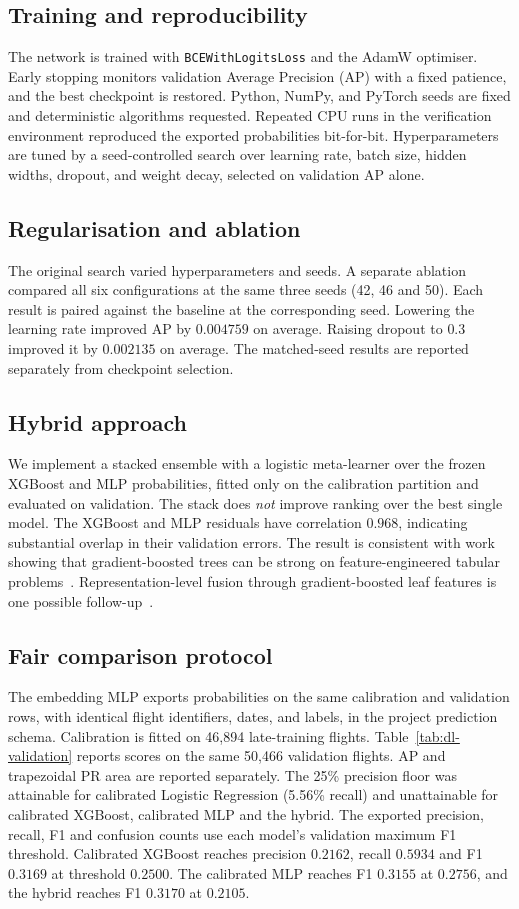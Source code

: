 \documentclass[conference]{IEEEtran}
\newcommand{\code}[1]{\texttt{#1}}
\begin{document}
\subsection{Training and reproducibility}
The network is trained with \code{BCEWithLogitsLoss} and the AdamW optimiser.
Early stopping monitors validation Average Precision (AP) with a fixed patience,
and the best checkpoint is restored. Python, NumPy, and PyTorch seeds are fixed
and deterministic algorithms requested. Repeated CPU runs in the verification
environment reproduced the exported probabilities bit-for-bit.
Hyperparameters are tuned by a seed-controlled search
over learning rate, batch size, hidden widths, dropout, and weight decay, selected
on validation AP alone.

\subsection{Regularisation and ablation}
The original search varied hyperparameters and seeds. A separate ablation
compared all six configurations at the same three seeds (42, 46 and 50).
Each result is paired against the baseline at the corresponding seed.
Lowering the learning rate improved AP by $0.004759$ on average. Raising
dropout to $0.3$ improved it by $0.002135$ on average. The matched-seed
results are reported separately from checkpoint selection.

\subsection{Hybrid approach}
We implement a stacked ensemble with a logistic
meta-learner over the frozen XGBoost and MLP probabilities, fitted only on the
calibration partition and evaluated on validation. The stack does \emph{not}
improve ranking over the best single model. The XGBoost and MLP residuals have
correlation $0.968$, indicating substantial overlap in their validation errors.
The result is consistent with work showing that gradient-boosted trees can be
strong on feature-engineered tabular problems~\cite{grinsztajn,shwartzziv}.
Representation-level fusion through gradient-boosted leaf features is one
possible follow-up~\cite{fbgbdt}.

\subsection{Fair comparison protocol}
The embedding MLP exports probabilities on the same calibration and validation
rows, with identical flight identifiers, dates, and labels, in the project
prediction schema. Calibration is fitted on 46,894 late-training flights.
Table~\ref{tab:dl-validation} reports scores on the same 50,466 validation
flights. AP and trapezoidal PR area are reported separately. The 25\% precision
floor was attainable for calibrated Logistic Regression (5.56\% recall) and
unattainable for calibrated XGBoost, calibrated MLP and the hybrid. The exported
precision, recall, F1 and confusion counts use each model's validation maximum
F1 threshold. Calibrated XGBoost reaches precision $0.2162$, recall $0.5934$
and F1 $0.3169$ at threshold $0.2500$. The calibrated MLP reaches F1 $0.3155$
at $0.2756$, and the hybrid reaches F1 $0.3170$ at $0.2105$.
\end{document}
